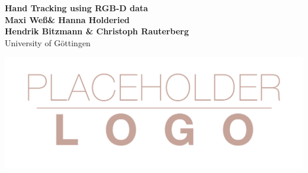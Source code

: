 \documentclass[a0,portrait]{a0poster}
\begin{document}


\begin{minipage}[b]{0.75\linewidth}
\veryHuge \color{NavyBlue} \textbf{Hand Tracking using RGB-D data} \color{Black}\\[0.5cm] %
\huge \textbf{Maxi We\ss \& Hanna Holderied}\\[0.5cm] %
\huge \textbf{Hendrik Bitzmann \& Christoph Rauterberg}\\[0.5cm] %
\huge University of G\"ottingen\\[0.4cm] %
\end{minipage}
%
\begin{minipage}[b]{0.25\linewidth}
\includegraphics[width=20cm]{logo.png}\\
\end{minipage}

\vspace{1cm} %

\normalsize
\end{document}
